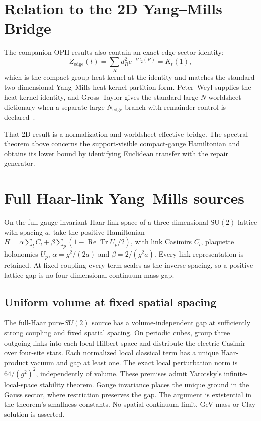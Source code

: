 \documentclass[11pt]{article}
\numberwithin{equation}{section}
\theoremstyle{remark}
\begin{document}
\section{Relation to the 2D Yang--Mills Bridge}
\label{sec:twod-bridge}

The companion OPH results also contain an exact edge-sector identity:
\[
Z_{\mathrm{edge}}(t)=\sum_R d_R^2e^{-tC_2(R)}=K_t(1),
\]
which is the compact-group heat kernel at the identity and matches the standard
two-dimensional Yang--Mills heat-kernel partition form. Peter--Weyl supplies the heat-kernel
identity, and Gross--Taylor gives the standard large-\(N\) worldsheet dictionary when a separate
large-\(N_{\mathrm{edge}}\) branch with remainder control is declared~\cite{peter-weyl,gross-taylor}.

That 2D result is a normalization and worldsheet-effective bridge. The spectral theorem above
concerns the support-visible compact-gauge Hamiltonian and obtains its lower bound by identifying
Euclidean transfer with the repair generator.

\section{Full Haar-link Yang--Mills sources}
\label{sec:full-haar-finite-source}

On the full gauge-invariant Haar link space of a three-dimensional
\(\mathrm{SU}(2)\) lattice with spacing \(a\), take the positive Hamiltonian
\(H=\alpha\sum_l C_l+\beta\sum_p(1-\operatorname{Re}\operatorname{Tr}U_p/2)\),
with link Casimirs \(C_l\), plaquette holonomies \(U_p\),
\(\alpha=g^2/(2a)\) and \(\beta=2/(g^2a)\). Every link representation is
retained. At fixed coupling every term scales as the inverse spacing, so a
positive lattice gap is no four-dimensional continuum mass gap.

\subsection{Uniform volume at fixed spatial spacing}

The full-Haar pure-$SU(2)$ source has a volume-independent gap at sufficiently
strong coupling and fixed spatial spacing. On periodic cubes, group three
outgoing links into each local Hilbert space and distribute the electric
Casimir over four-site stars. Each normalized local classical term has a unique
Haar-product vacuum and gap at least one. The exact local perturbation norm is
$64/(g^2)^2$, independently of volume. These premises admit Yarotsky's
infinite-local-space stability theorem. Gauge invariance places the unique
ground in the Gauss sector, where restriction preserves the gap. The argument
is existential in the theorem's smallness constants. No spatial-continuum limit, GeV mass or Clay
solution is asserted.
\end{document}
